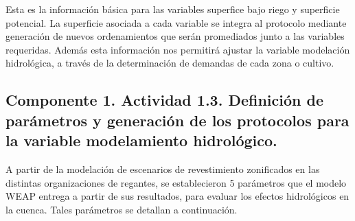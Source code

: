\documentclass[]{article}
\begin{document}
Esta es la información básica para las variables superfice bajo riego y superficie potencial. La superficie asociada a cada variable se integra al protocolo mediante generación de nuevos ordenamientos que serán promediados junto a las variables requeridas. Además esta información nos permitirá ajustar la variable modelación hidrológica, a través de la determinación de demandas de cada zona o cultivo.

\subsection{Componente 1. Actividad 1.3. Definición de parámetros y generación de los protocolos para la variable modelamiento hidrológico.}

A partir de la modelación de escenarios de revestimiento zonificados en las distintas organizaciones de regantes, se establecieron 5 parámetros que el modelo WEAP entrega a partir de sus resultados, para evaluar los efectos hidrológicos en la cuenca. Tales parámetros se detallan a continuación.
\end{document}
